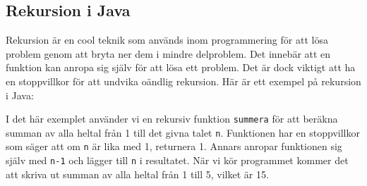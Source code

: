 \hypertarget{rekursion-i-java}{%
\subsection{Rekursion i Java}\label{rekursion-i-java}}

Rekursion är en cool teknik som används inom programmering för att lösa
problem genom att bryta ner dem i mindre delproblem. Det innebär att en
funktion kan anropa sig själv för att lösa ett problem. Det är dock
viktigt att ha en stoppvillkor för att undvika oändlig rekursion. Här är
ett exempel på rekursion i Java:

\hypertarget{cb4}{}
\begin{Shaded}
\begin{Highlighting}[]
 \OperatorTok{\{}
       \OperatorTok{(}\OperatorTok{[]}\OperatorTok{)} \OperatorTok{\{}

        \OperatorTok{=} \OperatorTok{(}\OperatorTok{);}
        \OperatorTok{(} \OperatorTok{+}\OperatorTok{);}
    \OperatorTok{\}}

       \OperatorTok{(}\OperatorTok{)} \OperatorTok{\{}
         \OperatorTok{(}\OperatorTok{==} \OperatorTok{)} \OperatorTok{\{}
             \OperatorTok{;}
        \OperatorTok{\}}  \OperatorTok{\{}
            \OperatorTok{+} \OperatorTok{(}\OperatorTok{{-}} \OperatorTok{);}
    \OperatorTok{\}}
\OperatorTok{\}}
\end{Highlighting}
\end{Shaded}

I det här exemplet använder vi en rekursiv funktion \texttt{summera} för
att beräkna summan av alla heltal från 1 till det givna talet
\texttt{n}. Funktionen har en stoppvillkor som säger att om \texttt{n}
är lika med 1, returnera 1. Annars anropar funktionen sig själv med
\texttt{n-1} och lägger till \texttt{n} i resultatet. När vi kör
programmet kommer det att skriva ut summan av alla heltal från 1 till 5,
vilket är 15.

